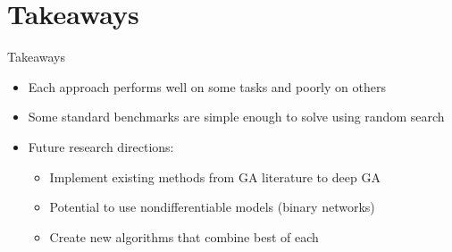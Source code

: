 \documentclass{beamer}
\begin{document}
	\section*{Takeaways}
	
	\begin{frame}{Takeaways}
		\begin{itemize}
			\item Each approach performs well on some tasks and poorly on others
			\item Some standard benchmarks are simple enough to solve using random search
			\item Future research directions:
			\begin{itemize}
				\item Implement existing methods from GA literature to deep GA
				\item Potential to use nondifferentiable models (binary networks)
				\item Create new algorithms that combine best of each
			\end{itemize}
		\end{itemize}
	\end{frame}
	
	

	
\end{document}
